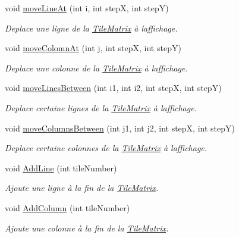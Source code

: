 \begin{DoxyCompactItemize}
void \hyperlink{class_tile_matrix_a6b17e33f46e947e5cb81a0c056e17614}{move\+Line\+At} (int i, int stepX, int stepY)
\begin{DoxyCompactList}\small\item\em Deplace une ligne de la \hyperlink{class_tile_matrix}{Tile\+Matrix} à l\textquotesingle{}affichage. \end{DoxyCompactList}\item 
void \hyperlink{class_tile_matrix_ae524f79b278e3e77c428d33f69e82508}{move\+Colomn\+At} (int j, int stepX, int stepY)
\begin{DoxyCompactList}\small\item\em Deplace une colonne de la \hyperlink{class_tile_matrix}{Tile\+Matrix} à l\textquotesingle{}affichage. \end{DoxyCompactList}\item 
void \hyperlink{class_tile_matrix_afc71f9142da00380320980d56eef47ab}{move\+Lines\+Between} (int i1, int i2, int stepX, int stepY)
\begin{DoxyCompactList}\small\item\em Deplace certaine lignes de la \hyperlink{class_tile_matrix}{Tile\+Matrix} à l\textquotesingle{}affichage. \end{DoxyCompactList}\item 
void \hyperlink{class_tile_matrix_a3e5871c9ab9dab10f83c86584db871f7}{move\+Columns\+Between} (int j1, int j2, int stepX, int stepY)
\begin{DoxyCompactList}\small\item\em Deplace certaine colonnes de la \hyperlink{class_tile_matrix}{Tile\+Matrix} à l\textquotesingle{}affichage. \end{DoxyCompactList}\item 
void \hyperlink{class_tile_matrix_aa54a37298476381854db5a561de3fbc0}{Add\+Line} (int tile\+Number)
\begin{DoxyCompactList}\small\item\em Ajoute une ligne à la fin de la \hyperlink{class_tile_matrix}{Tile\+Matrix}. \end{DoxyCompactList}\item 
void \hyperlink{class_tile_matrix_a9ca9a8babaf656aa675af069caf90e90}{Add\+Column} (int tile\+Number)
\begin{DoxyCompactList}\small\item\em Ajoute une colonne à la fin de la \hyperlink{class_tile_matrix}{Tile\+Matrix}. \end{DoxyCompactList}\item 

\end{DoxyCompactItemize}
